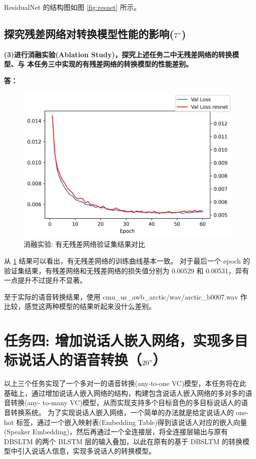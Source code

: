 \documentclass[degree=project,degree-type=project,cjk-font=noto]{thuthesis}
\begin{document}
ResidualNet 的结构图如图 \ref{fig:resnet} 所示。

\section{探究残差网络对转换模型性能的影响($7"$)}

\textbf{(3)进行消融实验(Ablation Study)，探究上述任务二中无残差网络的转换模型、与 本任务三中实现的有残差网络的转换模型的性能差别。}

\textbf{答：}

\begin{figure}[h]
\centering%
\includegraphics[width=.75\linewidth]{resnet_ablation.png}
  \caption{消融实验: 有无残差网络验证集结果对比}
  \label{fig:resnet_ablation}
\end{figure}

从 \ref{fig:resnet_ablation} 结果可以看出，有无残差网络的训练曲线基本一致。
对于最后一个 epoch 的验证集结果，有残差网络和无残差网络的损失值分别为 0.00529 和 0.00531，异有一点提升不过提升不显著。

至于实际的语音转换结果，使用 cmu\_us\_awb\_arctic/wav/arctic\_b0007.wav 作比较，感觉这两种模型的结果听起来没什么差别。

\chapter{任务四: 增加说话人嵌入网络，实现多目标说话人的语音转换（$20"$）}

以上三个任务实现了一个多对一的语音转换(any-to-one VC)模型，本任务将在此基础上，通过增加说话人嵌入网络的结构，构建包含说话人嵌入网络的多对多的语音转换(any- to-many VC)模型，从而实现支持多个目标音色的多目标说话人的语音转换系统。
为了实现说话人嵌入网络，一个简单的办法就是给定说话人的 one-hot 标签，通过一个嵌入映射表(Embedding Table)得到该说话人对应的嵌入向量(Speaker Embedding)，然后再通过一个全连接层，将全连接层输出与原有 DBSLTM 的两个 BLSTM 层的输入叠加，以此在原有的基于 DBSLTM 的转换模型中引入说话人信息，实现多说话人的转换模型。
\end{document}
